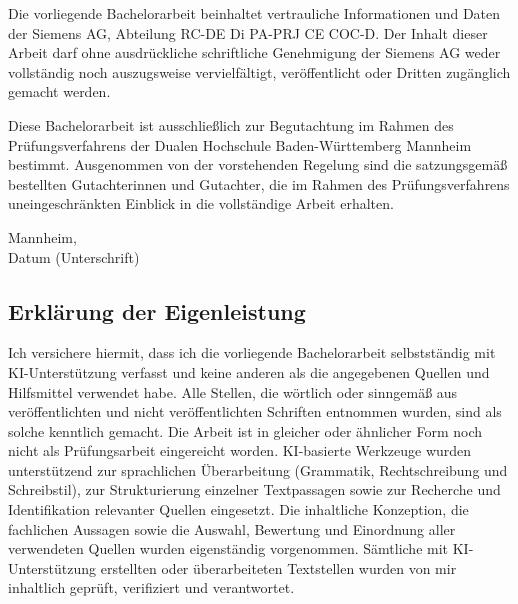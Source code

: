 \documentclass[12pt,a4paper]{article}
\begin{document}
Die vorliegende Bachelorarbeit beinhaltet vertrauliche Informationen und Daten der Siemens AG, Abteilung RC-DE Di PA-PRJ CE COC-D. Der Inhalt dieser Arbeit darf ohne ausdrückliche schriftliche Genehmigung der Siemens AG weder vollständig noch auszugsweise vervielfältigt, veröffentlicht oder Dritten zugänglich gemacht werden.

Diese Bachelorarbeit ist ausschließlich zur Begutachtung im Rahmen des Prüfungsverfahrens der Dualen Hochschule Baden-Württemberg Mannheim bestimmt. Ausgenommen von der vorstehenden Regelung sind die satzungsgemäß bestellten Gutachterinnen und Gutachter, die im Rahmen des Prüfungsverfahrens uneingeschränkten Einblick in die vollständige Arbeit erhalten.

\vspace{2cm}
\noindent Mannheim, \underline{\hspace{4cm}} \hfill \underline{\hspace{5cm}}\\
\hspace*{4.5cm} Datum \hfill (Unterschrift)

\newpage
\begin{center}

\section*{Erklärung der Eigenleistung}

\end{center}

\noindent Ich versichere hiermit, dass ich die vorliegende Bachelorarbeit selbstständig mit KI-Unterstützung verfasst und keine anderen als die angegebenen Quellen und Hilfsmittel verwendet habe. Alle Stellen, die wörtlich oder sinngemäß aus veröffentlichten und nicht veröffentlichten Schriften entnommen wurden, sind als solche kenntlich gemacht. Die Arbeit ist in gleicher oder ähnlicher Form noch nicht als Prüfungsarbeit eingereicht worden.
KI-basierte Werkzeuge wurden unterstützend zur sprachlichen Überarbeitung (Grammatik, Rechtschreibung und Schreibstil), zur Strukturierung einzelner Textpassagen sowie zur Recherche und Identifikation relevanter Quellen eingesetzt. Die inhaltliche Konzeption, die fachlichen Aussagen sowie die Auswahl, Bewertung und Einordnung aller verwendeten Quellen wurden eigenständig vorgenommen. Sämtliche mit KI-Unterstützung erstellten oder überarbeiteten Textstellen wurden von mir inhaltlich geprüft, verifiziert und verantwortet.
\end{document}
